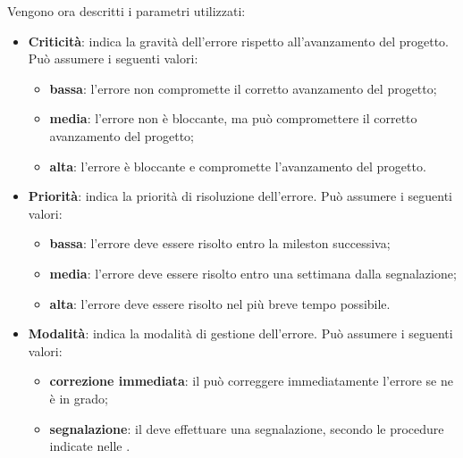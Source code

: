 Vengono ora descritti i parametri utilizzati:
\begin{itemize}
	\item \textbf{Criticità}: indica la gravità dell'errore rispetto all'avanzamento del progetto. Può assumere i seguenti valori:
	\begin{itemize}
		\item \textbf{bassa}: l'errore non compromette il corretto avanzamento del progetto;
		\item \textbf{media}: l'errore non è bloccante, ma può compromettere il corretto avanzamento del progetto;
		\item \textbf{alta}: l'errore è bloccante e compromette l'avanzamento del progetto.	
	\end{itemize}
	\item \textbf{Priorità}: indica la priorità di risoluzione dell'errore. Può assumere i seguenti valori:
	\begin{itemize}
		\item \textbf{bassa}: l'errore deve essere risolto entro la mileston successiva;
		\item \textbf{media}: l'errore deve essere risolto entro una settimana dalla segnalazione;
		\item \textbf{alta}: l'errore deve essere risolto nel più breve tempo possibile.
	\end{itemize}
	\item \textbf{Modalità}: indica la modalità di gestione dell'errore. Può assumere i seguenti valori:
	\begin{itemize}
		\item \textbf{correzione immediata}: il \Verificatore{} può correggere immediatamente l'errore se ne è in grado;
		\item \textbf{segnalazione}: il \Verificatore deve effettuare una segnalazione, secondo le procedure indicate nelle \NormeDiProgetto.
	\end{itemize}
\end{itemize}
